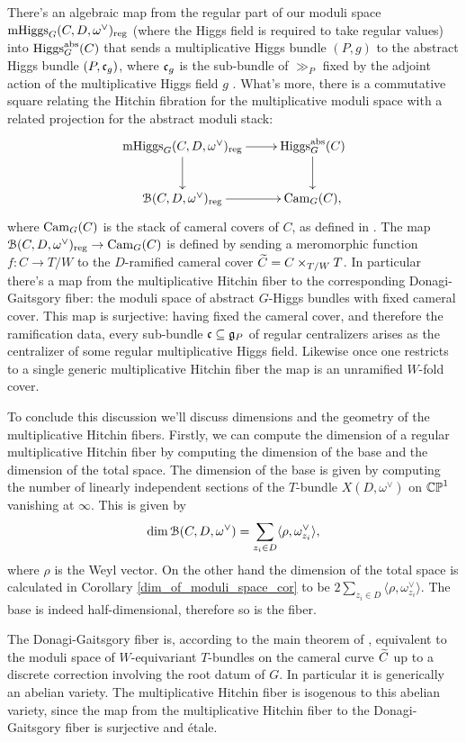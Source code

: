 \documentclass[10pt, oneside]{article}
\DeclareMathOperator{\mhiggs}{mHiggs}
\begin{document}
There's an algebraic map from the regular part of our moduli space $\mhiggs_G(C,D,\omega^\vee)_{\mr{reg}}$ (where the Higgs field is required to take regular values) into $\operatorname{Higgs}_G^{\mathrm{abs}}(C)$ that sends a multiplicative Higgs bundle $(P,g)$ to the abstract Higgs bundle $(P, \mathfrak{c}_g)$, where $\mathfrak{c}_g$ is the sub-bundle of $\gg_P$ fixed by the adjoint action of the multiplicative Higgs field $g$  .  What's more, there is a commutative square relating the Hitchin fibration for the multiplicative moduli space with a related projection for the abstract moduli stack:
\[\xymatrix{
\mhiggs_G(C,D,\omega^\vee)_{\mr{reg}} \ar[r] \ar[d] &\higgs_G^{\mr{abs}}(C) \ar[d] \\
\mc B(C,D,\omega^\vee)_{\mr{reg}} \ar[r] &\mr{Cam}_G(C),
}\]
where $\mathrm{Cam}_G(C)$ is the stack of cameral covers of $C$, as defined in \cite[Section 2.8]{DonagiGaitsgory}.  The map $\mathcal{B}(C,D,\omega^\vee)_{\mathrm{reg}} \to \mathrm{Cam}_G(C)$ is defined by sending a meromorphic function $f \colon C \to T/W$ to the $D$-ramified cameral cover $\widetilde{C} = C \times_{T/W} T$.  In particular there's a map from the multiplicative Hitchin fiber to the corresponding Donagi-Gaitsgory fiber: the moduli space of abstract $G$-Higgs bundles with fixed cameral cover.  This map is surjective: having fixed the cameral cover, and therefore the ramification data, every sub-bundle $\mathfrak{c} \subseteq \mathfrak{g}_P$ of regular centralizers arises as the centralizer of some regular multiplicative Higgs field.  Likewise once one restricts to a single generic multiplicative Hitchin fiber the map is an unramified $W$-fold cover.

To conclude this discussion we'll discuss dimensions and the geometry of the multiplicative Hitchin fibers.  Firstly, we can compute the dimension of a regular multiplicative Hitchin fiber by computing the dimension of the base and the dimension of the total space.  The dimension of the base is given by computing the number of linearly independent sections of the $T$-bundle $X(D,\omega^\vee)$ on $\mathbb{CP}^1$ vanishing at $\infty$.  This is given by 
\[\dim \mathcal{B}(C,D,\omega^\vee) = \sum_{z_i \in D} \langle \rho, \omega^\vee_{z_i} \rangle,\]
where $\rho$ is the Weyl vector.  On the other hand the dimension of the total space is calculated in Corollary \ref{dim_of_moduli_space_cor} to be $2 \sum_{z_i \in D} \langle \rho, \omega^\vee_{z_i} \rangle$.  The base is indeed half-dimensional, therefore so is the fiber.

The Donagi-Gaitsgory fiber is, according to the main theorem of \cite{DonagiGaitsgory}, equivalent to the moduli space of $W$-equivariant $T$-bundles on the cameral curve $\widetilde{C}$ up to a discrete correction involving the root datum of $G$.  In particular it is generically an abelian variety.  The multiplicative Hitchin fiber is isogenous to this abelian variety, since the map from the multiplicative Hitchin fiber to the Donagi-Gaitsgory fiber is surjective and \'etale.
\end{document}
